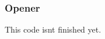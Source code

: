 \documentclass[11pt]{article}
\begin{document}
        \subsubsection{Opener}
                This code isnt finished yet.





    
\end{document}
